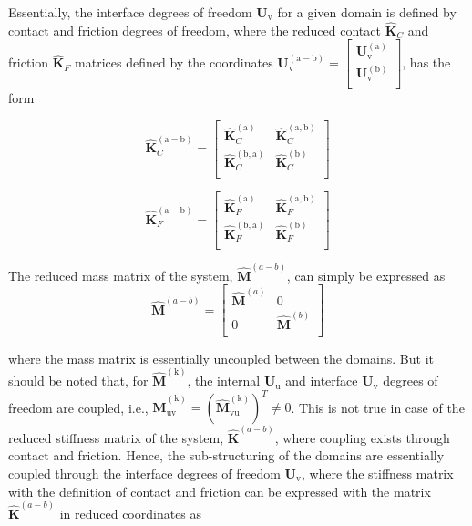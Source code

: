  
Essentially, the interface degrees of freedom $\bm U_{\mathrm v}$ for a given domain is defined by contact and friction degrees of freedom, where the reduced contact $\mathbf{\hat K}_C$ and friction $\mathbf{\hat K}_F$ matrices defined by the coordinates 
$\bm U^{\mathrm{(a-b)}}_{\mathrm v}=
\left[\begin{array}{cc}
  \bm U_{\mathrm{v}}^{\mathrm{(a)}} \\
  \bm U_{\mathrm{v}}^{\mathrm{(b)}} \\
\end{array}\right]
$, has the form
 
 \begin{equation}
 \mathbf{\hat K}_C^{\mathrm{(a-b)}} = 
 \left[
\begin{array}{cc}
  {{\mathbf{\hat K}}}^{\mathrm{(a)}}_C &{{\mathbf{\hat K}}}^{\mathrm{(a,b)}}_C \\
  {{\mathbf{\hat K}}}^{\mathrm{(b,a)}}_C &{{\mathbf{\hat K}}}^{\mathrm{(b)}}_C \\
\end{array}
\right]
 \end{equation}
 
 \begin{equation}
 \mathbf{\hat K}_F^{\mathrm{(a-b)}} = 
 \left[
\begin{array}{cc}
  {{\mathbf{\hat K}}}^{\mathrm{(a)}}_F &{{\mathbf{\hat K}}}^{\mathrm{(a,b)}}_F \\
  {{\mathbf{\hat K}}}^{\mathrm{(b,a)}}_F &{{\mathbf{\hat K}}}^{\mathrm{(b)}}_F \\
\end{array}
\right]
 \end{equation}
 
 The reduced mass matrix of the system, $\mathbf{\hat{M}}^{(a-b)}$, can simply be expressed as
 \begin{equation}
 \mathbf{\hat{M}}^{(a-b)}=\left[
\begin{array}{cc}
  {{\mathbf{\hat M}}}^{(a)} &0\\
  0&{\mathbf{\hat M}}^{(b)} \\
\end{array}
\right] 
 \end{equation}
 
 where the mass matrix is essentially uncoupled between the domains. But it should be noted that, for $\mathbf{\hat{M}}^{(\mathrm k)}$, the internal ${\bm U_{\mathrm u}}$ and interface ${\bm U_{\mathrm v}}$ degrees of freedom are coupled, i.e., ${\mathbf{\hat M}}_{\mathrm{uv}}^{(\mathrm k)} =  ({{\mathbf{\hat M}}^{(\mathrm k)}_{\mathrm{vu}}})^T \neq 0$. This is not true in case of the reduced stiffness matrix of the system, $\mathbf{\hat{K}}^{(a-b)}$, where coupling exists through contact and friction. Hence, the sub-structuring of the domains are essentially coupled through the interface degrees of freedom $\bm U_{\mathrm v}$, where the stiffness matrix with the definition of contact and friction can be expressed with the matrix $\mathbf{\hat{K}}^{(a-b)}$ in reduced coordinates as
  
